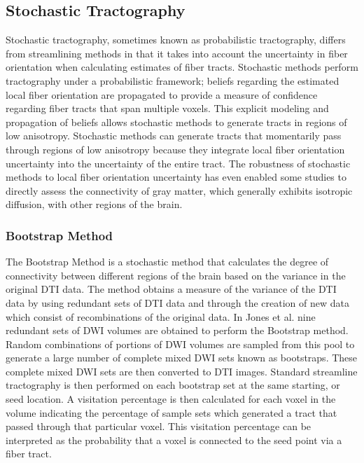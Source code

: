 \subsection{Stochastic Tractography}
Stochastic tractography, sometimes known as probabilistic tractography, differs from streamlining methods in that it takes into account the uncertainty in fiber orientation when calculating estimates of fiber tracts.  Stochastic methods perform tractography under a probabilistic framework;  beliefs regarding the estimated local fiber orientation are propagated to provide a measure of confidence regarding fiber tracts that span multiple voxels.  This explicit modeling and propagation of beliefs allows stochastic methods to generate tracts in regions of low anisotropy. Stochastic methods can generate tracts that momentarily pass through regions of low anisotropy because they integrate local fiber orientation uncertainty into the uncertainty of the entire tract.  The robustness of stochastic methods to local fiber orientation uncertainty has even enabled some studies to directly assess the connectivity of gray matter, which generally exhibits isotropic diffusion, with other regions of the brain\cite{behrensMRM03}.

\subsubsection{Bootstrap Method}

The Bootstrap Method is a stochastic method that calculates the degree of connectivity between different regions of the brain based on the variance in the original DTI data.  The method obtains a measure of the variance of the DTI data by using redundant sets of DTI data and through the creation of new data which consist of recombinations of the original data.  In Jones et al. \cite{derek} nine redundant sets of DWI volumes are obtained to perform the Bootstrap method.  Random combinations of portions of DWI volumes are sampled from this pool to generate a large number of complete mixed DWI sets known as bootstraps.  These complete mixed DWI sets are then converted to DTI images.  Standard streamline tractography is then performed on each bootstrap set at the same starting, or seed location.  A visitation percentage is then calculated for each voxel in the volume indicating the percentage of sample sets which generated a tract that passed through that particular voxel.  This visitation percentage can be interpreted as the probability that a voxel is connected to the seed point via a fiber tract.

